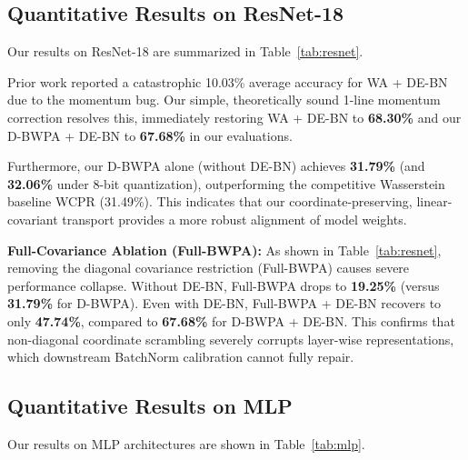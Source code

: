 \documentclass{article}
\theoremstyle{plain}
\theoremstyle{definition}
\theoremstyle{remark}
\begin{document}
\subsection{Quantitative Results on ResNet-18}
Our results on ResNet-18 are summarized in Table~\ref{tab:resnet}. 

Prior work reported a catastrophic 10.03\% average accuracy for WA + DE-BN due to the momentum bug. Our simple, theoretically sound 1-line momentum correction resolves this, immediately restoring WA + DE-BN to \textbf{68.30\%} and our D-BWPA + DE-BN to \textbf{67.68\%} in our evaluations. 

Furthermore, our D-BWPA alone (without DE-BN) achieves \textbf{31.79\%} (and \textbf{32.06\%} under 8-bit quantization), outperforming the competitive Wasserstein baseline WCPR (31.49\%). This indicates that our coordinate-preserving, linear-covariant transport provides a more robust alignment of model weights.

\textbf{Full-Covariance Ablation (Full-BWPA):} As shown in Table~\ref{tab:resnet}, removing the diagonal covariance restriction (Full-BWPA) causes severe performance collapse. Without DE-BN, Full-BWPA drops to \textbf{19.25\%} (versus \textbf{31.79\%} for D-BWPA). Even with DE-BN, Full-BWPA + DE-BN recovers to only \textbf{47.74\%}, compared to \textbf{67.68\%} for D-BWPA + DE-BN. This confirms that non-diagonal coordinate scrambling severely corrupts layer-wise representations, which downstream BatchNorm calibration cannot fully repair.

\subsection{Quantitative Results on MLP}
Our results on MLP architectures are shown in Table~\ref{tab:mlp}.
\end{document}

